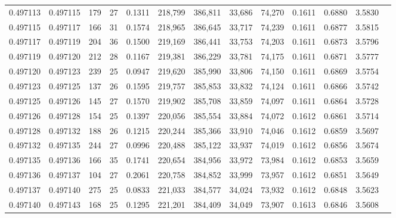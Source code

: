 \begin{tabular}{rrrrrrrrrrrrr}
0.497113 & 0.497115 & 179 &  27 &                                     0.1311 & 218,799 & 386,811 &  33,686 &  74,270 & 0.1611 & 0.6880 & 3.5830 \\
0.497115 & 0.497117 & 166 &  31 &                                     0.1574 & 218,965 & 386,645 &  33,717 &  74,239 & 0.1611 & 0.6877 & 3.5815 \\
0.497117 & 0.497119 & 204 &  36 &                                     0.1500 & 219,169 & 386,441 &  33,753 &  74,203 & 0.1611 & 0.6873 & 3.5796 \\
0.497119 & 0.497120 & 212 &  28 &                                     0.1167 & 219,381 & 386,229 &  33,781 &  74,175 & 0.1611 & 0.6871 & 3.5777 \\
0.497120 & 0.497123 & 239 &  25 &                                     0.0947 & 219,620 & 385,990 &  33,806 &  74,150 & 0.1611 & 0.6869 & 3.5754 \\
0.497123 & 0.497125 & 137 &  26 &                                     0.1595 & 219,757 & 385,853 &  33,832 &  74,124 & 0.1611 & 0.6866 & 3.5742 \\
0.497125 & 0.497126 & 145 &  27 &                                     0.1570 & 219,902 & 385,708 &  33,859 &  74,097 & 0.1611 & 0.6864 & 3.5728 \\
0.497126 & 0.497128 & 154 &  25 &                                     0.1397 & 220,056 & 385,554 &  33,884 &  74,072 & 0.1612 & 0.6861 & 3.5714 \\
0.497128 & 0.497132 & 188 &  26 &                                     0.1215 & 220,244 & 385,366 &  33,910 &  74,046 & 0.1612 & 0.6859 & 3.5697 \\
0.497132 & 0.497135 & 244 &  27 &                                     0.0996 & 220,488 & 385,122 &  33,937 &  74,019 & 0.1612 & 0.6856 & 3.5674 \\
0.497135 & 0.497136 & 166 &  35 &                                     0.1741 & 220,654 & 384,956 &  33,972 &  73,984 & 0.1612 & 0.6853 & 3.5659 \\
0.497136 & 0.497137 & 104 &  27 &                                     0.2061 & 220,758 & 384,852 &  33,999 &  73,957 & 0.1612 & 0.6851 & 3.5649 \\
0.497137 & 0.497140 & 275 &  25 &                                     0.0833 & 221,033 & 384,577 &  34,024 &  73,932 & 0.1612 & 0.6848 & 3.5623 \\
0.497140 & 0.497143 & 168 &  25 &                                     0.1295 & 221,201 & 384,409 &  34,049 &  73,907 & 0.1613 & 0.6846 & 3.5608 \\

\end{tabular}
